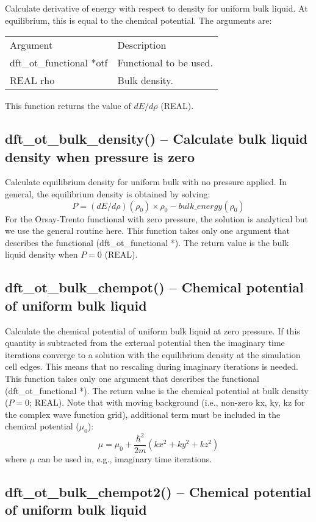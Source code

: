 \documentclass[12pt,letterpaper]{report}
\begin{document}
Calculate derivative of energy with respect to density for uniform bulk liquid. At equilibrium, this is equal to the chemical potential. The arguments are:
\begin{longtable}{p{} p{}}
Argument & Description\\
\cline{1-2}
dft\_ot\_functional *otf & Functional to be used.\\
REAL rho & Bulk density.\\
\end{longtable}
This function returns the value of $dE/d\rho$ (REAL).

\subsection{dft\_ot\_bulk\_density() -- Calculate bulk liquid density when pressure is zero}

Calculate equilibrium density for uniform bulk with no pressure applied. In general, the equilibrium density is obtained by solving:\\
$$ P = (dE/d\rho)(\rho_0)\times \rho_0 - bulk\_energy(\rho_0)$$
For the Orsay-Trento functional with zero pressure, the solution is analytical but we use the general routine here. This function takes only one argument that describes the functional (dft\_ot\_functional *). The return value is the bulk liquid density when $P = 0$ (REAL).

\subsection{dft\_ot\_bulk\_chempot() -- Chemical potential of uniform bulk liquid}

Calculate the chemical potential of uniform bulk liquid at zero pressure. If this quantity is subtracted from the external potential then the imaginary time iterations converge to a solution with the equilibrium density at the simulation cell edges. This means that no rescaling during imaginary iterations is needed. This function takes only one argument that describes the functional (dft\_ot\_functional *). The return value is the chemical potential at bulk density ($P = 0$; REAL). Note that with moving background (i.e., non-zero kx, ky, kz for the complex wave function grid), additional term must be included in the chemical potential ($\mu_0$):
$$\mu = \mu_0 + \frac{\hbar^2}{2m}\left(kx^2 + ky^2 + kz^2\right)$$
where $\mu$ can be used in, e.g., imaginary time iterations.

\subsection{dft\_ot\_bulk\_chempot2() -- Chemical potential of uniform bulk liquid}
\end{document}

